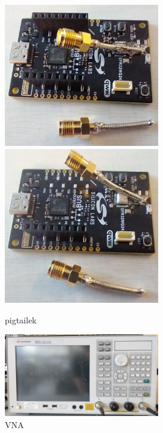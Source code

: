 \documentclass[a4paper,12pt,titlepage]{article}
\begin{document}
            \begin{figure}
                \centering
                \includegraphics[width=0.6\textwidth]{kep/szerkesztett/pigtail1.jpg}
                \includegraphics[width=0.6\textwidth]{kep/szerkesztett/pigtail2.jpg}
                \caption{pigtailek}
                \label{fig:pigtail}
            \end{figure}

            \begin{figure}
                \centering
                \includegraphics[width=0.6\textwidth]{kep/szerkesztett/vna.jpg}
                \caption{VNA}
                \label{fig:vna}
            \end{figure}
\end{document}
